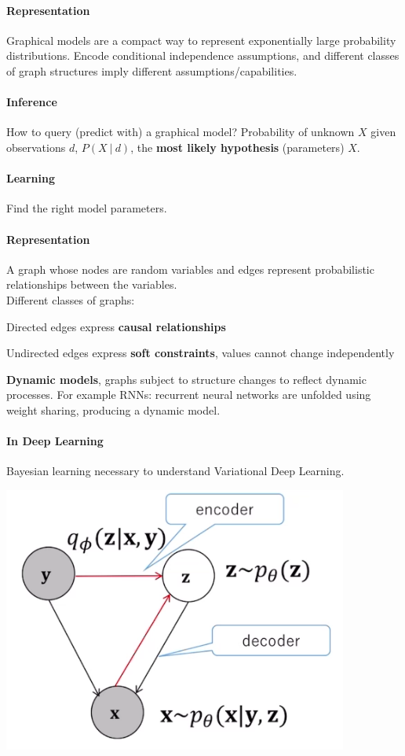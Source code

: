 \documentclass[10pt]{report}
\begin{document}
\paragraph{Representation} Graphical models are a compact way to represent exponentially large probability distributions. Encode conditional independence assumptions, and different classes of graph structures imply different assumptions/capabilities.
\paragraph{Inference} How to query (predict with) a graphical model? Probability of unknown $X$ given observations $d$, $P(X\:|\:d)$, the \textbf{most likely hypothesis} (parameters) $X$.
\paragraph{Learning} Find the right model parameters.
\paragraph{Representation} A graph whose nodes are random variables and edges represent probabilistic relationships between the variables.\\
Different classes of graphs:
\begin{list}{}{}
	\item Directed edges express \textbf{causal relationships}
	\item Undirected edges express \textbf{soft constraints}, values cannot change independently
	\item \textbf{Dynamic models}, graphs subject to structure changes to reflect dynamic processes. For example RNNs: recurrent neural networks are unfolded using weight sharing, producing a dynamic model.
\end{list}
\paragraph{In Deep Learning} Bayesian learning necessary to understand Variational Deep Learning.
\begin{center}
	\includegraphics[scale=0.5]{14.png}
\end{center}
\end{document}
